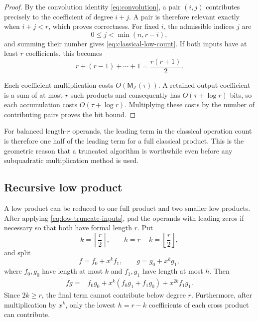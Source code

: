 \documentclass[11pt]{book}
\theoremstyle{definition}
\newcommand{\ZZ}{\mathbb Z}
\newcommand{\MZ}{\mathsf M_{\ZZ}}
\begin{document}
\begin{proof}
By the convolution identity \eqref{eq:convolution}, a pair $(i,j)$ contributes
precisely to the coefficient of degree $i+j$.  A pair is therefore relevant
exactly when $i+j<r$, which proves correctness.  For fixed $i$, the admissible
indices $j$ are
\[
 0\leq j<\min(n,r-i),
\]
and summing their number gives \eqref{eq:classical-low-count}.  If both
inputs have at least $r$ coefficients, this becomes
\[
 r+(r-1)+\cdots+1=\frac{r(r+1)}2.
\]

Each coefficient multiplication costs $O(\MZ(\tau))$.  A retained output
coefficient is a sum of at most $r$ such products and consequently has
$O(\tau+\log r)$ bits, so each accumulation costs
$O(\tau+\log r)$.  Multiplying these costs by the number of contributing
pairs proves the bit bound.
\end{proof}

For balanced length-$r$ operands, the leading term in the classical operation
count is therefore one half of the leading term for a full classical product.
This is the geometric reason that a truncated algorithm is worthwhile even
before any subquadratic multiplication method is used.

\subsection{Recursive low product}

A low product can be reduced to one full product and two smaller low products.
After applying \eqref{eq:low-truncate-inputs}, pad the operands with leading
zeros if necessary so that both have formal length $r$.  Put
\[
 k=\left\lceil\frac r2\right\rceil,
 \qquad
 h=r-k=\left\lfloor\frac r2\right\rfloor,
\]
and split
\[
 f=f_0+x^k f_1,
 \qquad
 g=g_0+x^k g_1,
\]
where $f_0,g_0$ have length at most $k$ and $f_1,g_1$ have length at most
$h$.  Then
\begin{align}
 fg={}&f_0g_0+x^k(f_0g_1+f_1g_0)+x^{2k}f_1g_1.
\end{align}
Since $2k\geq r$, the final term cannot contribute below degree $r$.
Furthermore, after multiplication by $x^k$, only the lowest $h=r-k$
coefficients of each cross product can contribute.
\end{document}
